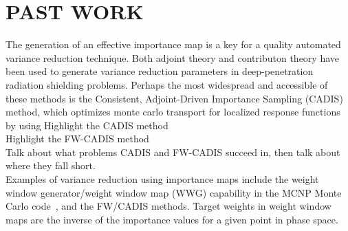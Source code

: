 \documentclass[12pt]{article}
\begin{document}




\section{PAST WORK}
\label{sect::past}

The generation of an effective importance map is a key for a quality automated variance reduction technique. Both adjoint theory and contributon theory have been used to generate variance reduction parameters in deep-penetration radiation shielding problems. Perhaps the most widespread and accessible of these methods is the Consistent, Adjoint-Driven Importance Sampling (CADIS) method, which optimizes monte carlo transport for localized response functions by using 
Highlight the CADIS method \\
Highlight the FW-CADIS method \\
Talk about what problems CADIS and FW-CADIS succeed in, then talk about where they fall short. \\

Examples of variance reduction using importance maps include the weight window generator/weight window map (WWG) capability in the MCNP Monte Carlo code~\cite{brown_mcnp_2002}, and the FW/CADIS methods. Target weights in weight window maps are the inverse of the importance values for a given point in phase space.
\end{document}
